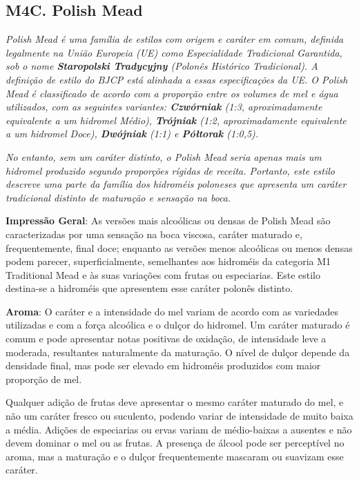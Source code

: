 \subsection*{M4C. Polish Mead}

\textit{Polish Mead é uma família de estilos com origem e caráter em comum, definida legalmente na União Europeia (UE) como Especialidade Tradicional Garantida, sob o nome \textbf{Staropolski Tradycyjny} (Polonês Histórico Tradicional). A definição de estilo do BJCP está alinhada a essas especificações da UE. O Polish Mead é classificado de acordo com a proporção entre os volumes de mel e água utilizados, com as seguintes variantes: \textbf{Czwórniak} (1:3, aproximadamente equivalente a um hidromel Médio), \textbf{Trójniak} (1:2, aproximadamente equivalente a um hidromel Doce), \textbf{Dwójniak} (1:1) e \textbf{Półtorak} (1:0,5).}

\textit{No entanto, sem um caráter distinto, o Polish Mead seria apenas mais um hidromel produzido segundo proporções rígidas de receita. Portanto, este estilo descreve uma parte da família dos hidroméis poloneses que apresenta um caráter tradicional distinto de maturação e sensação na boca.}

\textbf{Impressão Geral}: As versões mais alcoólicas ou densas de Polish Mead são caracterizadas por uma sensação na boca viscosa, caráter maturado e, frequentemente, final doce; enquanto as versões menos alcoólicas ou menos densas podem parecer, superficialmente, semelhantes aos hidroméis da categoria M1 Traditional Mead e às suas variações com frutas ou especiarias. Este estilo destina-se a hidroméis que apresentem esse caráter polonês distinto.

\textbf{Aroma}: O caráter e a intensidade do mel variam de acordo com as variedades utilizadas e com a força alcoólica e o dulçor do hidromel. Um caráter maturado é comum e pode apresentar notas positivas de oxidação, de intensidade leve a moderada, resultantes naturalmente da maturação. O nível de dulçor depende da densidade final, mas pode ser elevado em hidroméis produzidos com maior proporção de mel.

Qualquer adição de frutas deve apresentar o mesmo caráter maturado do mel, e não um caráter fresco ou suculento, podendo variar de intensidade de muito baixa a média. Adições de especiarias ou ervas variam de médio-baixas a ausentes e não devem dominar o mel ou as frutas. A presença de álcool pode ser perceptível no aroma, mas a maturação e o dulçor frequentemente mascaram ou suavizam esse caráter.

